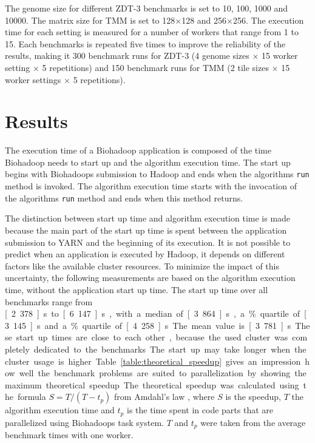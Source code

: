 The genome size for different ZDT-3 benchmarks is set to 10, 100, 1000 and 10000. The matrix size for TMM is set to 128$\times$128 and 256$\times$256. The execution time for each setting is measured for a number of workers that range from 1 to 15. Each benchmarks is repeated five times to improve the reliability of the results, making it 300 benchmark runs for ZDT-3 (4 genome sizes $\times$ 15 worker setting $\times$ 5 repetitions) and 150 benchmark runs for TMM (2 tile sizes $\times$ 15 worker settings $\times$ 5 repetitions).

\section{Results}
\label{chap:evaluation:result}
The execution time of a Biohadoop application is composed of the time Biohadoop needs to start up and the algorithm execution time. The start up begins with Biohadoops submission to Hadoop and ends when the algorithms \texttt{run} method is invoked. The algorithm execution time starts with the invocation of the algorithms \texttt{run} method and ends when this method returns.

The distinction between start up time and algorithm execution time is made because the main part of the start up time is spent between the application submission to YARN and the beginning of its execution. It is not possible to predict when an application is executed by Hadoop, it depends on different factors like the available cluster resources. To minimize the impact of this uncertainty, the following measurements are based on the algorithm execution time, without the application start up time. The start up time over all benchmarks range from \unit[2.378]{s} to \unit[6.147]{s}, with a median of \unit[3.864]{s}, a \unit[25]{\%} quartile of \unit[3.145]{s} and a \unit[75]{\%} quartile of \unit[4.258]{s}. The mean value is \unit[3.781]{s}. These start up times are close to each other, because the used cluster was completely dedicated to the benchmarks. The start up may take longer when the cluster usage is higher.

Table \ref{table:theoretical_speedup} gives an impression how well the benchmark problems are suited to parallelization by showing the maximum theoretical speedup. The theoretical speedup was calculated using the formula $S = T / (T - t_p)$ from Amdahl's law \cite{amdahl1967validity}, where $S$ is the speedup, $T$ the algorithm execution time and $t_p$ is the time spent in code parts that are parallelized using Biohadoops task system. $T$ and $t_p$ were taken from the average benchmark times with one worker.

